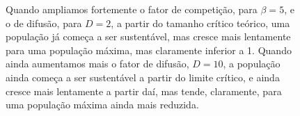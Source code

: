 \documentclass{article}
\begin{document}
 	\begin{figure}[h]
 		\centering
 		\qquad
 		\caption{Quando ampliamos fortemente o fator de competição, para $\beta=5$, e o de difusão, para $D=2$, a partir do tamanho crítico teórico, uma população já começa a ser sustentável, mas cresce mais lentamente para uma população máxima, mas claramente inferior a 1. Quando ainda aumentamos mais o fator de difusão, $D=10$, a população ainda começa a ser sustentável a partir do limite crítico, e ainda cresce mais lentamente a partir daí, mas tende, claramente, para uma população máxima ainda mais reduzida.}
 		\label{fig:TamanhoMax-alpha1-beta5-D2}
 	\end{figure}
 
\end{document}
